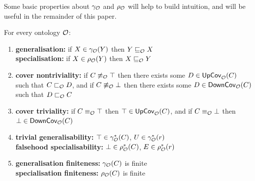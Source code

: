 \documentclass[
]{ceurart}
\begin{document}
Some basic properties about $\gamma_{\mathcal{O}}$ and $\rho_{\mathcal{O}}$ will help to build intuition, and will be useful in the remainder of this paper.
%
\begin{lemma}\label{lem:gen}
For every ontology $\mathcal{O}$:%
\newcommand\litem[1]{\item{\bfseries #1:\enspace }}
\begin{enumerate}
\litem{generalisation}\label{item:generalisation} if $X \in \gamma_{\mathcal{O}}(Y)$ then $Y \sqsubseteq_{\mathcal{O}} X$\\
\textbf{specialisation:\enspace} if $X \in \rho_{\mathcal{O}}(Y)$ then $X \sqsubseteq_{\mathcal{O}} Y$
\litem{cover nontriviality}\label{item:cover-nontriviality} if $C \not \equiv_\mathcal{O} \top$ then there exists some $D \in \mathsf{UpCov}_\mathcal{O}(C)$ such that $C \sqsubset_\mathcal{O} D$, and if $C \not \equiv_\mathcal{O} \bot$ then there exists some $D \in \mathsf{DownCov}_\mathcal{O}(C)$ such that $D \sqsubset_\mathcal{O} C$
\litem{cover triviality}\label{item:cover-triviality} if $C \equiv_\mathcal{O} \top$ then $\top \in \mathsf{UpCov}_\mathcal{O} (C)$, and if $C \equiv_\mathcal{O} \bot$ then $\bot \in \mathsf{DownCov}_\mathcal{O}(C)$
\litem{trivial generalisability}\label{item:trivial-generalisability} $\top \in \gamma_{\mathcal{O}}^*(C)$, $U \in \gamma_{\mathcal{O}}^*(r)$ %
\\ 
\textbf{falsehood specialisability:\enspace} $\bot \in \rho_{\mathcal{O}}^*(C)$, $E \in \rho_{\mathcal{O}}^*(r)$%
\litem{generalisation finiteness}\label{item:generalisation-finiteness} $\gamma_{\mathcal{O}}(C)$ is finite\\
\textbf{specialisation finiteness:\enspace} $\rho_{\mathcal{O}}(C)$ is finite
\end{enumerate}
\end{lemma}
\end{document}
